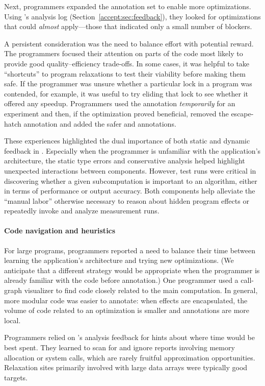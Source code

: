Next, programmers expanded the annotation set to enable more optimizations.
Using \sysname's analysis log (Section~\ref{accept:sec:feedback}), they looked for
optimizations that could \emph{almost} apply---those that indicated only a
small number of blockers.

A persistent consideration was the need to balance effort with potential
reward.  The programmers focused their attention on parts of the code
most likely to provide good quality--efficiency trade-offs.
In some cases, it was helpful to take ``shortcuts'' to program relaxations to
test their viability before making them safe.
If the programmer was unsure whether a particular lock in a
program was contended, for example, it was useful to try eliding that lock to
see whether it offered any speedup.
Programmers used the \annpermit annotation
\emph{temporarily} for an experiment and then, if the optimization proved
beneficial, removed the escape-hatch annotation and added the safer
 and  annotations.

These experiences highlighted the dual importance of both static and dynamic
feedback in \sysname.
Especially when the programmer is unfamiliar with the application's
architecture, the static type errors and conservative \precisepurity analysis
helped highlight unexpected interactions between components.
However, test runs were critical in discovering whether a
given subcomputation is important to an algorithm, either in terms of
performance or output accuracy.
Both components help alleviate the ``manual labor'' otherwise necessary to
reason about hidden program effects or repeatedly invoke and analyze
measurement runs.

\paragraph{Code navigation and heuristics}
For large programs, programmers reported a need to balance their time
between learning the application's architecture and trying new
optimizations.
(We anticipate that a different strategy would be appropriate when the
programmer is already familiar with the code before annotation.)
One programmer used a call-graph visualizer to find code closely related
to the main computation.
In general, more modular code was easier to annotate: when effects are
encapsulated, the volume of code related to an optimization is smaller
and annotations are more local.

Programmers relied on \sysname's analysis feedback for hints about where time
would be best spent.
They learned to scan for and ignore reports involving memory allocation
or system calls, which are rarely fruitful approximation opportunities.
Relaxation sites primarily involved with large data arrays were typically good
targets.

